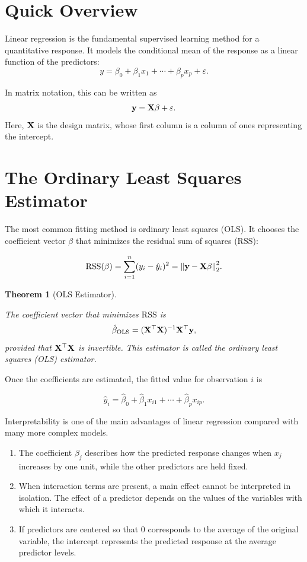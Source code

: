 \documentclass[
  letterpaper,
  DIV=11,
  numbers=noendperiod]{scrreprt}
\providecommand{\tightlist}{%
  \setlength{\itemsep}{0pt}\setlength{\parskip}{0pt}}
\newcommand{\rss}{\mathrm{RSS}}
\newcommand{\ols}{\mathrm{OLS}}
\theoremstyle{definition}
\theoremstyle{definition}
\theoremstyle{plain}
\newtheorem{theorem}{Theorem}[chapter]
\theoremstyle{plain}
\theoremstyle{remark}
\begin{document}
\section{Quick Overview}\label{quick-overview}

Linear regression is the fundamental supervised learning method for a
quantitative response. It models the conditional mean of the response as
a linear function of the predictors: \[
y = \beta_0 + \beta_1 x_1 + \cdots + \beta_p x_p + \varepsilon.
\]

In matrix notation, this can be written as \[
\vb y = \vb X\beta + \varepsilon.
\] Here, \(\vb X\) is the design matrix, whose first column is a column
of ones representing the intercept.

\section{The Ordinary Least Squares
Estimator}\label{the-ordinary-least-squares-estimator}

The most common fitting method is ordinary least squares (OLS). It
chooses the coefficient vector \(\beta\) that minimizes the residual sum
of squares (\(\rss\)):

\[
\rss(\beta) = \sum_{i=1}^n (y_i - \hat{y}_i)^2
= \norm{\vb y - \vb X\beta }_2^2.
\]

\begin{theorem}[OLS Estimator]\protect\hypertarget{thm-}{}\label{thm-}

The coefficient vector that minimizes \(\rss\) is \[
\hat{\beta}_{\ols} = (\vb X^\top \vb X)^{-1}\vb X^\top \vb y,
\] provided that \(\vb X^\top \vb X\) is invertible. This estimator is
called the ordinary least squares (OLS) estimator.

\end{theorem}

Once the coefficients are estimated, the fitted value for observation
\(i\) is

\[
\hat{y}_i = \hat{\beta}_0 + \hat{\beta}_1 x_{i1} + \cdots + \hat{\beta}_p x_{ip}.
\]

Interpretability is one of the main advantages of linear regression
compared with many more complex models.

\begin{enumerate}
\def\labelenumi{\arabic{enumi}.}
\tightlist
\item
  The coefficient \(\beta_j\) describes how the predicted response
  changes when \(x_j\) increases by one unit, while the other predictors
  are held fixed.
\item
  When interaction terms are present, a main effect cannot be
  interpreted in isolation. The effect of a predictor depends on the
  values of the variables with which it interacts.
\item
  If predictors are centered so that \(0\) corresponds to the average of
  the original variable, the intercept represents the predicted response
  at the average predictor levels.
\end{enumerate}
\end{document}
